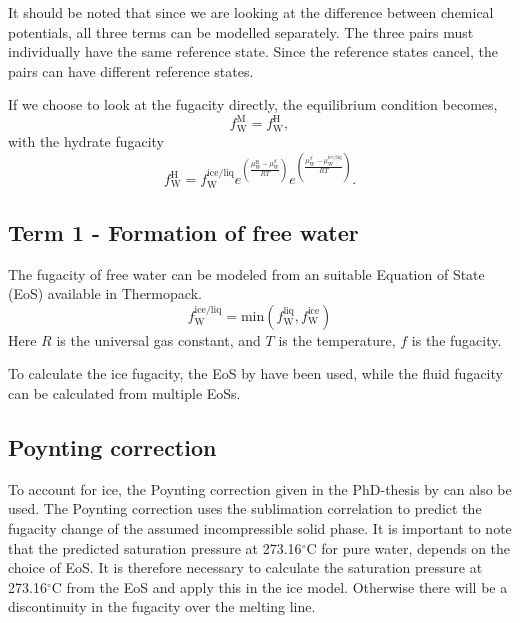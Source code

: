 \documentclass[english]{../thermomemo/thermomemo}
\newcommand{\celsius}{\ensuremath{^\circ\text{C}}}
\newcommand{\liq}{\text{liq}}
\newcommand{\hyd}{\text{H}}
\newcommand{\wat}{\text{W}}
\newcommand{\mix}{\text{M}}
\newcommand{\ice}{\text{ice}}
\newcommand{\free}{{\ice/\liq}}
\begin{document}
It should be noted that since we are looking at the difference between
chemical potentials, all three terms can be modelled separately. The
three pairs must individually have the same reference state. Since
the reference states cancel, the pairs can have different reference
states.

If we choose to look at the fugacity directly, the equilibrium
condition becomes,
\begin{equation}
\label{eq:fug}
f_\wat^\mix = f_\wat^\hyd,
\end{equation}
with the hydrate fugacity
\begin{equation}
\label{eq:fug_hyd}
f_\wat^\hyd = f_\wat^\free e^{\left(\frac{\mu_\wat^\hyd - \mu_\wat^\beta}{RT}\right)} e^{\left(\frac{\mu_\wat^\beta - \mu_\wat^\free}{RT}\right)} .
\end{equation}

\subsection{Term 1 - Formation of free water}
The fugacity of free water can be modeled from
an suitable Equation of State (EoS) available in Thermopack.
\begin{equation}
  \label{eq:freewatform}
   f_\wat^\free = \text{min} \left( f_\wat^\liq, f_\wat^\ice \right)
\end{equation}
Here $R$ is the universal gas constant, and $T$ is the temperature,
$f$ is the fugacity.

To calculate the ice fugacity, the EoS by \citet{Feistel2006} have
been used, while the fluid fugacity can be calculated from multiple
EoSs.

\subsection{Poynting correction}
To account for ice, the Poynting correction given in the PhD-thesis by
\citet{Haghighi2009} can also be used. The Poynting correction uses the
\citet{Wagner1994} sublimation correlation to predict the fugacity
change of the assumed incompressible solid phase. It is important to
note that the predicted saturation pressure at 273.16\unit{\celsius}
for pure water, depends on the choice of EoS. It is
therefore necessary to calculate the saturation pressure at
273.16\unit{\celsius} from the EoS and apply this in the ice
model. Otherwise there will be a discontinuity in the fugacity over
the melting line.
\end{document}
